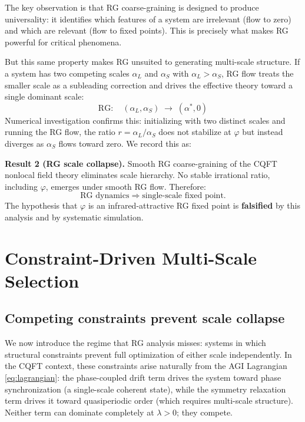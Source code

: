 \documentclass[11pt,a4paper]{article}
\theoremstyle{plain}
\theoremstyle{definition}
\newcommand{\phiGolden}{\varphi}
\begin{document}
The key observation is that RG coarse-graining is designed to produce
universality: it identifies which features of a system are irrelevant
(flow to zero) and which are relevant (flow to fixed points). This
is precisely what makes RG powerful for critical phenomena.

But this same property makes RG unsuited to generating multi-scale
structure. If a system has two competing scales $\alpha_L$ and
$\alpha_S$ with $\alpha_L > \alpha_S$, RG flow treats the smaller scale
as a subleading correction and drives the effective theory toward a
single dominant scale:
\begin{equation}
\text{RG}: \quad (\alpha_L, \alpha_S) \;\longrightarrow\; (\alpha^*, 0)
\end{equation}
Numerical investigation confirms this: initializing with two distinct
scales and running the RG flow, the ratio $r = \alpha_L / \alpha_S$
does not stabilize at $\phiGolden$ but instead diverges as $\alpha_S$
flows toward zero. We record this as:

\begin{keybox}
\textbf{Result 2 (RG scale collapse).}
Smooth RG coarse-graining of the CQFT nonlocal field theory eliminates
scale hierarchy. No stable irrational ratio, including $\phiGolden$,
emerges under smooth RG flow. Therefore:
\[
\text{RG dynamics} \;\Rightarrow\; \text{single-scale fixed point.}
\]
The hypothesis that $\phiGolden$ is an infrared-attractive RG fixed point
is \textbf{falsified} by this analysis and by systematic simulation.
\end{keybox}

\section{Constraint-Driven Multi-Scale Selection}
\label{sec:constraint}

\subsection{Competing constraints prevent scale collapse}

We now introduce the regime that RG analysis misses: systems in which
structural constraints prevent full optimization of either scale
independently. In the CQFT context, these constraints arise naturally
from the AGI Lagrangian \eqref{eq:lagrangian}: the phase-coupled drift
term drives the system toward phase synchronization (a single-scale
coherent state), while the symmetry relaxation term drives it toward
quasiperiodic order (which requires multi-scale structure). Neither
term can dominate completely at $\lambda > 0$; they compete.
\end{document}
